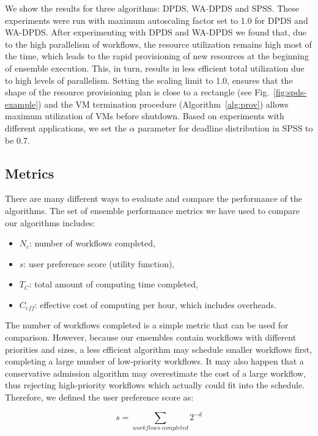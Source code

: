 \documentclass{sig-alternate}
\begin{document}
We show the results for three algorithms: DPDS, WA-DPDS and SPSS. These 
experiments were run with maximum autoscaling factor set to 1.0 for
DPDS and WA-DPDS. After experimenting with DPDS and WA-DPDS we found that, 
due to the high parallelism of workflows, the resource utilization remains 
high most of the time, which leads to the rapid provisioning of new resources 
at the beginning of ensemble execution. This, in turn, results in less 
efficient total utilization due to high levels of parallelism. Setting the 
scaling limit to 1.0, ensures that the shape of the resource provisioning 
plan  is close to a rectangle (see Fig.~\ref{fig:spds-example}) and the VM 
termination procedure (Algorithm~\ref{alg:prov}) allows maximum utilization 
of VMs before shutdown. Based on experiments with different applications, 
we set the $\alpha$ parameter for deadline distribution in SPSS to be 0.7.



\subsection{Metrics}

There are many different ways to evaluate and compare the performance of 
the algorithms. The set of ensemble performance metrics we have used to
compare our algorithms includes:

\begin{itemize}
  \item $N_c$: number of workflows completed,
  \item $s$: user preference score (utility function),
  \item $T_C$: total amount of computing time completed,
  \item $C_{eff}$: effective cost of computing per hour, which includes
  overheads.
\end{itemize}

The number of workflows completed is a simple metric that can be used for
comparison. However, because our ensembles contain workflows with different 
priorities and sizes, a less efficient algorithm may schedule smaller
workflows first, completing a large number of low-priority workflows. It may 
also happen that a conservative admission algorithm may overestimate the cost 
of a large workflow, thus rejecting high-priority workflows which actually 
could fit into the schedule. Therefore, we defined the user preference score as:

\begin{equation}
\label{eq:score}
s = \sum_{workflows\ completed}{2^{-d}}
\end{equation}
\end{document}
